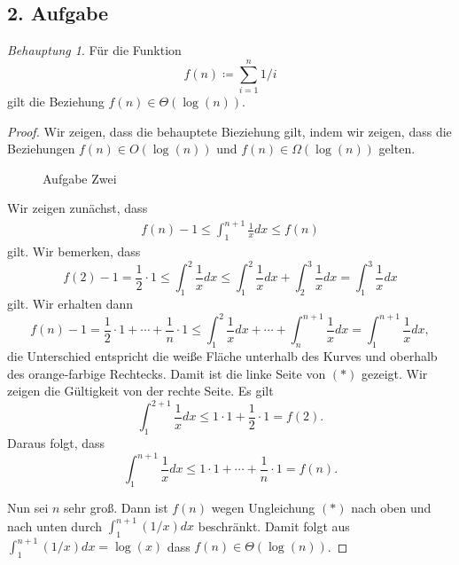 \documentclass[a5paper]{article}
\theoremstyle{remark}
\newtheorem*{Behauptung}{Behauptung}
\begin{document}
\subsection{2. Aufgabe}
\begin{Behauptung}
  Für die Funktion
  \[f(n) \coloneq \sum_{i=1}^{n}{1/i}\]
  gilt die Beziehung \(f(n)
  \in \Theta(\log(n))\).
\end{Behauptung}
\begin{proof}
  Wir zeigen, dass die behauptete Bieziehung gilt, indem wir zeigen,
  dass die Beziehungen \(f(n) \in O(\log(n))\) und
  \(f(n) \in \Omega(\log(n))\) gelten.
  \begin{figure}[t]
    \centering
    \caption{Aufgabe Zwei}
  \end{figure}
  Wir zeigen zunächst, dass
  \begin{align*}
    f(n) - 1 \le \int_{1}^{n+1}{\frac{1}{x}dx} \le f(n) \tag*{\((\ast)\)}
  \end{align*}
  gilt.  Wir bemerken, dass
  \[ f(2) - 1 = \frac{1}{2} \cdot 1 \le \int_{1}^{2}{\frac{1}{x}dx} \le
    \int_{1}^{2}{\frac{1}{x}dx} + \int_{2}^{3}{\frac{1}{x}dx} = \int_{1}^{3}{\frac{1}{x}dx}\]
  gilt.  Wir erhalten dann
  \[ f(n) - 1 = \frac{1}{2} \cdot 1 + \cdots + \frac{1}{n} \cdot 1 \le
    \int_{1}^{2}{\frac{1}{x}dx} + \cdots + \int_{n}^{n+1}{\frac{1}{x}dx} = \int_{1}^{n+1}{\frac{1}{x}dx},\]
  die Unterschied entspricht die weiße Fläche unterhalb des Kurves und
  oberhalb des orange-farbige Rechtecks. Damit ist die linke Seite von
  \((\ast)\)   gezeigt.  Wir zeigen die Gültigkeit von der rechte Seite. Es
  gilt
  \[ \int_{1}^{2+1}\frac{1}{x}dx \le 1 \cdot 1 + \frac{1}{2} \cdot 1 = f(2).\]
  Daraus folgt, dass
  \[\int_{1}^{n+1}\frac{1}{x}dx \le 1 \cdot 1 + \cdots + \frac{1}{n} \cdot 1 = f(n).\]

  Nun sei \(n\) sehr groß.  Dann ist \(f(n)\) wegen Ungleichung
  \((\ast)\) nach oben und nach unten durch \(\int_{1}^{n+1}(1/x)dx\)
  beschränkt.  Damit folgt aus \(\int_{1}^{n+1}(1/x)dx = \log(x)\) dass
  \(f(n) \in \Theta(\log(n))\).
\end{proof}
\end{document}
